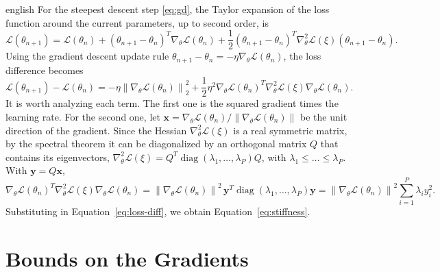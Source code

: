\documentclass[12pt,letterpaper,twoside]{book}
\newcommand{\norm}[1]{\left\lVert #1 \right\rVert}
\newcommand{\Loss}{\mathcal{L}}
\DeclareMathOperator{\diag}{diag}
\begin{document}
\begin{hyphenrules}{english}
For the steepest descent step \eqref{eq:gd}, the Taylor expansion of the loss function around the
current parameters, up to second order, is
\begin{equation}
  \Loss(\theta_{n+1})=\Loss(\theta_n)+(\theta_{n+1}-\theta_n)^{T}\nabla_\theta\Loss(\theta_n)
  +\frac12(\theta_{n+1}-\theta_n)^{T}\nabla^2_\theta\Loss(\xi)(\theta_{n+1}-\theta_n).
  \label{eq:taylor}
\end{equation}
Using the gradient descent update rule $\theta_{n+1}-\theta_n=-\eta\nabla_\theta\Loss(\theta_n)$, the
loss difference becomes
\begin{equation}
  \Loss(\theta_{n+1})-\Loss(\theta_n)=-\eta\norm{\nabla_\theta\Loss(\theta_n)}_2^2
  +\frac12\eta^2\nabla_\theta\Loss(\theta_n)^{T}\nabla^2_\theta\Loss(\xi)\nabla_\theta\Loss(\theta_n).
  \label{eq:loss-diff}
\end{equation}
It is worth analyzing each term. The first one is the squared gradient times the learning rate. For the
second one, let $\mathbf{x}=\nabla_\theta\Loss(\theta_n)/\norm{\nabla_\theta\Loss(\theta_n)}$ be the unit
direction of the gradient. Since the Hessian $\nabla^2_\theta\Loss(\xi)$ is a real symmetric matrix, by the
spectral theorem \cite{trefethen1997} it can be diagonalized by an orthogonal matrix $Q$ that contains
its eigenvectors, $\nabla^2_\theta\Loss(\xi)=Q^{T}\diag(\lambda_1,\dots,\lambda_P)Q$, with
$\lambda_1\le\dots\le\lambda_P$. With $\mathbf{y}=Q\mathbf{x}$,
\begin{equation}
  \nabla_\theta\Loss(\theta_n)^{T}\nabla^2_\theta\Loss(\xi)\nabla_\theta\Loss(\theta_n)
  =\norm{\nabla_\theta\Loss(\theta_n)}^2\,\mathbf{y}^{T}\diag(\lambda_1,\dots,\lambda_P)\mathbf{y}
  =\norm{\nabla_\theta\Loss(\theta_n)}^2\sum_{i=1}^{P}\lambda_iy_i^2.
  \label{eq:hessian-quadratic}
\end{equation}
Substituting in Equation~\eqref{eq:loss-diff}, we obtain Equation~\eqref{eq:stiffness}.

\section{Bounds on the Gradients}\label{app-sec:grad-bounds}


\end{hyphenrules}
\end{document}
